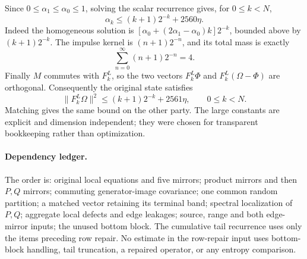 Since $0\leq \alpha_1\leq \alpha_0\leq1$, solving the scalar recurrence gives,
for $0\leq k<N$,
\[
 \alpha_k\leq(k+1)2^{-k}+2560\eta.                   \tag{B18}
\]
Indeed the homogeneous solution is
$[\alpha_0+(2\alpha_1-\alpha_0)k]2^{-k}$, bounded above by
$(k+1)2^{-k}$.  The impulse kernel is $(n+1)2^{-n}$, and its total
mass is exactly
\[
 \sum_{n=0}^{\infty}(n+1)2^{-n}=4.
\]
Finally $M$ commutes with $F_k^L$, so the two vectors
$F_k^L\Phi$ and $F_k^L(\Omega-\Phi)$ are orthogonal.  Consequently
the original state satisfies
\[
 \|F_k^L\Omega\|^2
 \leq(k+1)2^{-k}+2561\eta,\qquad0\leq k<N.      \tag{B19}
\]
Matching gives the same bound on the other party.  The large constants
are explicit and dimension independent; they were chosen for transparent
bookkeeping rather than optimization.

\paragraph{Dependency ledger.}
The order is: original local equations and five mirrors; product mirrors
and then $P,Q$ mirrors; commuting generator-image covariance; one common
random partition; a matched vector retaining its terminal band; spectral
localization of $P,Q$; aggregate local defects and edge leakages; source,
range and both edge-mirror inputs; the unused bottom block.  The cumulative
tail recurrence uses only the items preceding row repair.  No estimate in
the row-repair input uses bottom-block handling, tail truncation, a repaired
operator, or any entropy comparison.

